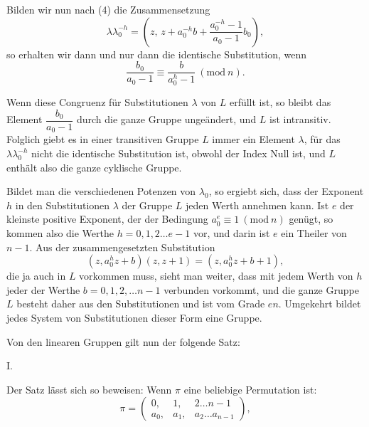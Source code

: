 
Bilden wir nun nach (4) die Zusammensetzung
\[
\lambda \lambda_0^{-h} = \left(z,\, z + a_0^{-h} b + \frac{a_0^{-h} - 1}{a_0 - 1} b_0\right),
\]
so erhalten wir dann und nur dann die identische Substitution, wenn
\[
\frac{b_0}{a_0 - 1} \equiv \frac{b}{a_0^h - 1}\ (\mathrm{mod}\ n).
\]

Wenn diese Congruenz für  Substitutionen $\lambda$ von $L$ erfüllt ist, so bleibt das Element $\dfrac{b_0}{a_0 - 1}$ durch die ganze Gruppe ungeändert, und $L$ ist intransitiv. Folglich giebt es in einer transitiven Gruppe $L$ immer ein Element $\lambda$, für das $\lambda \lambda_0^{-h}$ nicht die identische Substitution ist, obwohl der Index Null ist, und $L$ enthält also die ganze cyklische Gruppe.

Bildet man die verschiedenen Potenzen von $\lambda_0$, so ergiebt sich, dass der Exponent $h$ in den Substitutionen $\lambda$ der Gruppe $L$ jeden Werth annehmen kann. Ist $e$ der kleinste positive Exponent, der der Bedingung $a_0^e \equiv 1\ (\mathrm{mod}\ n)$ genügt, so kommen also die Werthe $h = 0, 1, 2 \ldots e - 1$ vor, und darin ist $e$ ein Theiler von $n - 1$. Aus der zusammengesetzten Substitution
\[
(z, a_0^h z + b)(z, z + 1) = (z, a_0^h z + b + 1),
\]
die ja auch in $L$ vorkommen muss, sieht man weiter, dass mit jedem Werth von $h$ jeder der Werthe $b = 0, 1, 2, \ldots n - 1$ verbunden vorkommt, und die ganze Gruppe $L$ besteht daher aus den Substitutionen
und ist vom Grade $en$. Umgekehrt bildet jedes System von Substitutionen dieser Form eine Gruppe.

Von den linearen Gruppen gilt nun der folgende Satz:

I. 

Der Satz lässt sich so beweisen:
Wenn $\pi$ eine beliebige Permutation ist:
\[
\pi = \begin{pmatrix} 0, & 1, & 2 \ldots n - 1 \\ a_0, & a_1, & a_2 \ldots a_{n-1} \end{pmatrix},
\]
